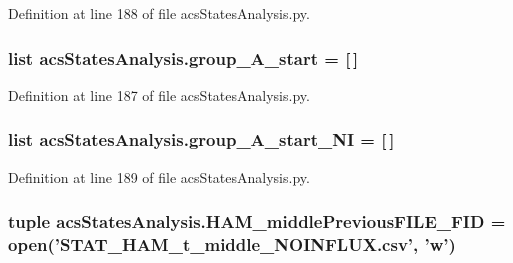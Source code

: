 Definition at line 188 of file acs\-States\-Analysis.\-py.

\hypertarget{a00104_a3898175300d001a17a60c23656d2812f}{
\subsubsection[{group\-\_\-\-A\-\_\-start}]{\setlength{\rightskip}{0pt plus 5cm}list acs\-States\-Analysis.\-group\-\_\-\-A\-\_\-start = \mbox{[}$\,$\mbox{]}}}\label{a00104_a3898175300d001a17a60c23656d2812f}


Definition at line 187 of file acs\-States\-Analysis.\-py.

\hypertarget{a00104_aedb746884c5ae6e301c8ad2d8307fe4d}{
\subsubsection[{group\-\_\-\-A\-\_\-start\-\_\-\-N\-I}]{\setlength{\rightskip}{0pt plus 5cm}list acs\-States\-Analysis.\-group\-\_\-\-A\-\_\-start\-\_\-\-N\-I = \mbox{[}$\,$\mbox{]}}}\label{a00104_aedb746884c5ae6e301c8ad2d8307fe4d}


Definition at line 189 of file acs\-States\-Analysis.\-py.

\hypertarget{a00104_aaf0dd6e74d88a7cf2e909301b422c17d}{
\subsubsection[{H\-A\-M\-\_\-middle\-Previous\-F\-I\-L\-E\-\_\-\-F\-I\-D}]{\setlength{\rightskip}{0pt plus 5cm}tuple acs\-States\-Analysis.\-H\-A\-M\-\_\-middle\-Previous\-F\-I\-L\-E\-\_\-\-F\-I\-D = open('S\-T\-A\-T\-\_\-\-H\-A\-M\-\_\-t\-\_\-middle\-\_\-\-N\-O\-I\-N\-F\-L\-U\-X.\-csv', 'w')}}\label{a00104_aaf0dd6e74d88a7cf2e909301b422c17d}


